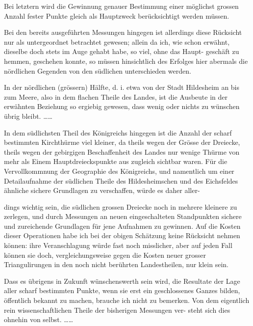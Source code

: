 \documentclass[12pt,a4paper]{article}
\theoremstyle{plain}
\theoremstyle{definition}
\theoremstyle{remark}
\begin{document}
\noindent
Bei letztern wird die Gewinnung genauer Bestimmung einer möglichst
grossen Anzahl fester Punkte gleich als Hauptzweck berücksichtigt werden
müssen.

\noindent
Bei den bereits ausgeführten Messungen hingegen ist allerdings diese
Rücksicht nur als untergeordnet betrachtet gewesen; allein da ich, wie schon
erwähnt, dieselbe doch stets im Auge gehabt habe, so viel, ohne das Haupt-
geschäft zu hemmen, geschehen konnte, so müssen hinsichtlich des Erfolges
hier abermals die nördlichen Gegenden von den südlichen unterschieden werden.

\noindent
In der nördlichen (grössern) Hälfte, d. i. etwa von der Stadt Hildesheim
an bis zum Meere, also in dem flachen Theile des Landes, ist die Ausbeute in
der erwähnten Beziehung so ergiebig gewesen, dass wenig oder nichts zu
wünschen übrig bleibt. \ldots\ldots

\noindent
In dem südlichsten Theil des Königreichs hingegen ist die Anzahl der
scharf bestimmten Kirchthürme viel kleiner, da theils wegen der Grösse der
Dreiecke, theils wegen der gebirgigen Beschaffenheit des Landes nur wenige
Thürme von mehr als Einem Hauptdreieckspunkte aus zugleich sichtbar waren.
Für die Vervollkommnung der Geographie des Königreichs, und namentlich
um einer Detailaufnahme der südlichen Theile des Hildesheimschen und des
Eichsfeldes ähnliche sichere Grundlagen zu verschaffen, würde es daher aller-

\noindent

\noindent
dings wichtig sein, die südlichen grossen Dreiecke noch in mehrere kleinere
zu zerlegen, und durch Messungen an neuen eingeschalteten Standpunkten
sichere und zureichende Grundlagen für jene Aufnahmen zu gewinnen. Auf
die Kosten dieser Operationen habe ich bei der obigen Schätzung keine
Rücksicht nehmen können: ihre Veranschlagung würde fast noch misslicher,
aber auf jeden Fall können sie doch, vergleichungsweise gegen die Kosten
neuer grosser Triangulirungen in den noch nicht berührten Landestheilen, nur
klein sein.

\noindent
Dass es übrigens in Zukunft wünschenswerth sein wird, die Resultate der
Lage aller scharf bestimmten Punkte, wenn sie erst ein geschlossenes Ganzes
bilden, öffentlich bekannt zu machen, brauche ich nicht zu bemerken. Von
dem eigentlich rein wissenschaftlichen Theile der bisherigen Messungen ver-
steht sich dies ohnehin von selbst. \ldots\ldots

\end{document}
